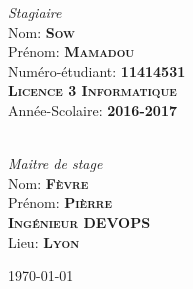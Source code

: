 \begin{titlepage}
\begin{center}
\begin{minipage}{0.4\textwidth}
\begin{flushleft} \large
\emph{Stagiaire}\\
Nom: \textbf{\textsc{Sow}}\\
 Prénom: \textbf{\textsc{Mamadou}}\\
Numéro-étudiant: \textbf{\textsc{11414531}}\\
\textbf{\textsc{Licence 3 Informatique}}\\
Année-Scolaire: \textbf{\textsc{2016-2017}}
\end{flushleft}
\end{minipage}
\begin{minipage}{0.4\textwidth}
\begin{flushright} \large
 \textbf{\textsc{}}\\
\emph{Maitre de stage} \\
Nom: \textbf{\textsc{Fèvre  }}\\
Prénom: \textbf{\textsc{Pièrre   }}\\
\textbf{\textsc{Ingénieur DEVOPS}}\\
Lieu:   \textbf{\textsc{Lyon    }}\\
\end{flushright}
\end{minipage}




\vfill

{\large \today}

\end{center}
\end{titlepage}
